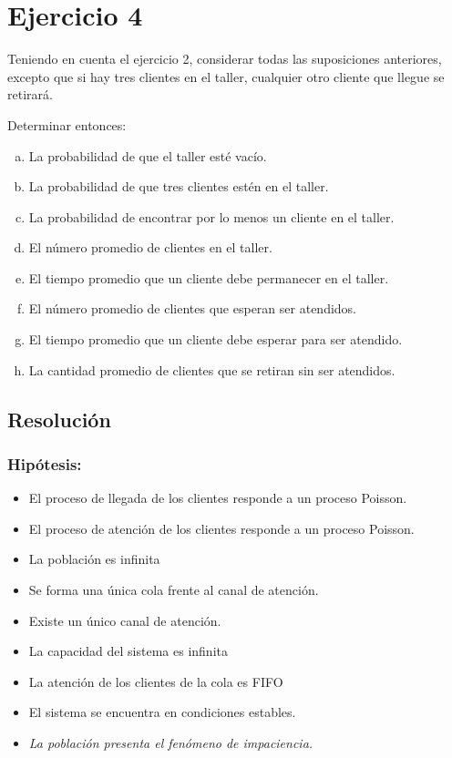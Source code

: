 \documentclass[a4paper,11pt]{article}
\begin{document}
\vspace{35pt}
\section*{\textbf{Ejercicio 4}}

Teniendo en cuenta el ejercicio 2, considerar todas las suposiciones
anteriores, excepto que si hay tres clientes en el taller, cualquier otro
cliente que llegue se retirará.

Determinar entonces:

\leftskip=36pt
\parindent=-18pt
\begin{enumerate}[a)]
  \item La probabilidad de que el taller esté vacío.
  \item La probabilidad de que tres clientes estén en el taller.
  \item La probabilidad de encontrar por lo menos un cliente en el taller.
  \item El número promedio de clientes en el taller.
  \item El tiempo promedio que un cliente debe permanecer en el taller.
  \item El número promedio de clientes que esperan ser atendidos.
  \item El tiempo promedio que un cliente debe esperar para ser atendido.
  \item La cantidad promedio de clientes que se retiran sin ser atendidos.
\end{enumerate}

\vspace{13pt}
\leftskip=0pt
\parindent=0pt
\subsection*{\textbf{Resolución}}

\vspace{5pt}
\leftskip=0pt
\parindent=0pt
\subsubsection*{Hipótesis:}

\leftskip=36pt
\parindent=-18pt
\begin{itemize}
  \item El proceso de llegada de los clientes responde a un proceso Poisson.
  \item El proceso de atención de los clientes responde a un proceso Poisson.
  \item La población es infinita
  \item Se forma una única cola frente al canal de atención.
  \item Existe un único canal de atención.
  \item La capacidad del sistema es infinita
  \item La atención de los clientes de la cola es FIFO
  \item El sistema se encuentra en condiciones estables.
  \item \textit{La población presenta el fenómeno de impaciencia.}
\end{itemize}
\end{document}
